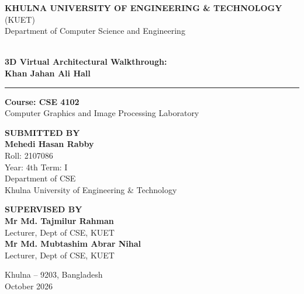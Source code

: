 \documentclass[11pt,a4paper]{article}
\begin{document}
\thispagestyle{empty}
{\centering
    \vspace*{0.2cm}
    
    {\Large\textbf{KHULNA UNIVERSITY OF ENGINEERING \& TECHNOLOGY}}\\[0.2cm]
    {\large (KUET)}\\[0.2cm]
    {\large Department of Computer Science and Engineering}\\[0.3cm]
    
    \noindent\makebox[\linewidth]{\color{kuetnavy}\rule{\textwidth}{1.8pt}}\\[0.8cm]
    
    \vspace{0.8cm}
    
    {\fontsize{24pt}{30pt}\selectfont \textbf{\color{kuetnavy}3D Virtual Architectural Walkthrough:}}\\[0.4cm]
    {\fontsize{22pt}{28pt}\selectfont \textbf{\color{kuetblue}Khan Jahan Ali Hall}}\\[1.2cm]
    
    \begin{center}
        \color{kuetaccent}\rule{5cm}{1.2pt}
    \end{center}
    \vspace{0.6cm}
    
    {\large\textbf{Course: CSE 4102}}\\[0.15cm]
    {\normalsize Computer Graphics and Image Processing Laboratory}\\[2.6cm]
    
    \begin{minipage}[t]{0.48\textwidth}
        \raggedright
        \textbf{\large\color{kuetnavy}SUBMITTED BY}\\[0.3cm]
        \textbf{Mehedi Hasan Rabby}\\
        Roll: 2107086\\[0.15cm]
        Year: 4th \quad Term: I\\[0.15cm]
        Department of CSE\\
        Khulna University of Engineering \& Technology
    \end{minipage}
    \hfill
    \begin{minipage}[t]{0.48\textwidth}
        \raggedleft
        \textbf{\large\color{kuetnavy}SUPERVISED BY}\\[0.3cm]
        \textbf{Mr Md. Tajmilur Rahman}\\
        Lecturer, Dept of CSE, KUET\\[0.4cm]
        \textbf{Mr Md. Mubtashim Abrar Nihal}\\
        Lecturer, Dept of CSE, KUET
    \end{minipage}
    
    \vfill
    {\normalsize Khulna -- 9203, Bangladesh}\\[0.15cm]
    {\normalsize October 2026}\par
}
\end{document}
